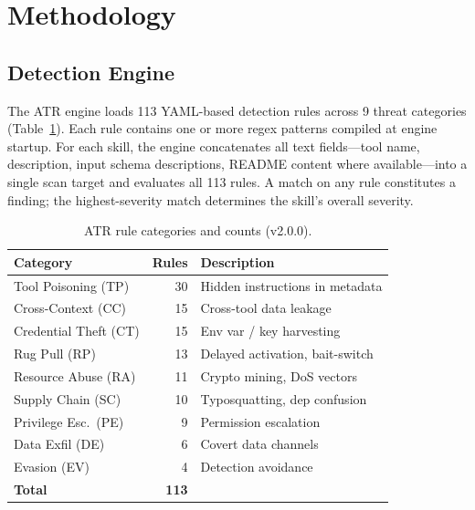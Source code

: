 \documentclass[letterpaper,twocolumn,10pt]{article}
\begin{document}
\section{Methodology}
\label{sec:method}

\subsection{Detection Engine}

The ATR engine loads 113 YAML-based detection rules across 9 threat
categories (Table~\ref{tab:categories}).  Each rule contains one or more
regex patterns compiled at engine startup.  For each skill, the engine
concatenates all text fields---tool name, description, input schema
descriptions, README content where available---into a single scan target
and evaluates all 113 rules.  A match on any rule constitutes a finding;
the highest-severity match determines the skill's overall severity.

\begin{table}[t]
\centering
\caption{ATR rule categories and counts (v2.0.0).}
\label{tab:categories}
\small
\begin{tabular}{@{}lrl@{}}
\toprule
\textbf{Category} & \textbf{Rules} & \textbf{Description} \\
\midrule
Tool Poisoning (TP)    & 30 & Hidden instructions in metadata \\
Cross-Context (CC)     & 15 & Cross-tool data leakage \\
Credential Theft (CT)  & 15 & Env var / key harvesting \\
Rug Pull (RP)          & 13 & Delayed activation, bait-switch \\
Resource Abuse (RA)    & 11 & Crypto mining, DoS vectors \\
Supply Chain (SC)      & 10 & Typosquatting, dep confusion \\
Privilege Esc.\ (PE)   &  9 & Permission escalation \\
Data Exfil (DE)        &  6 & Covert data channels \\
Evasion (EV)           &  4 & Detection avoidance \\
\midrule
\textbf{Total}         & \textbf{113} & \\
\bottomrule
\end{tabular}
\end{table}
\end{document}
